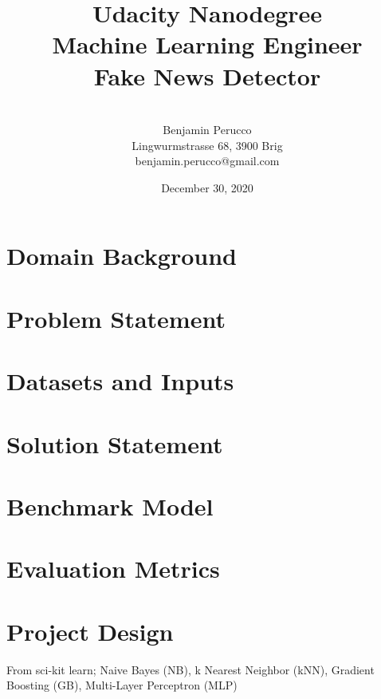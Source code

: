 \documentclass[a4paper]{article}
\begin{document}
\title{{\large Udacity Nanodegree\\Machine Learning Engineer}\\[1.5cm]Fake News Detector}
\author{\\[1.5cm]Benjamin Perucco\\Lingwurmstrasse 68, 3900 Brig\\benjamin.perucco@gmail.com}
\date{December 30, 2020} 
\maketitle
\thispagestyle{empty}

\newpage
\tableofcontents
\thispagestyle{empty}
\newpage

\section{Domain Background}

\section{Problem Statement}

\section{Datasets and Inputs}

\section{Solution Statement}

\section{Benchmark Model}

\section{Evaluation Metrics}

\section{Project Design}

From sci-kit learn; Naive Bayes (NB), k Nearest Neighbor (kNN), Gradient Boosting (GB), Multi-Layer Perceptron (MLP)
\end{document}
